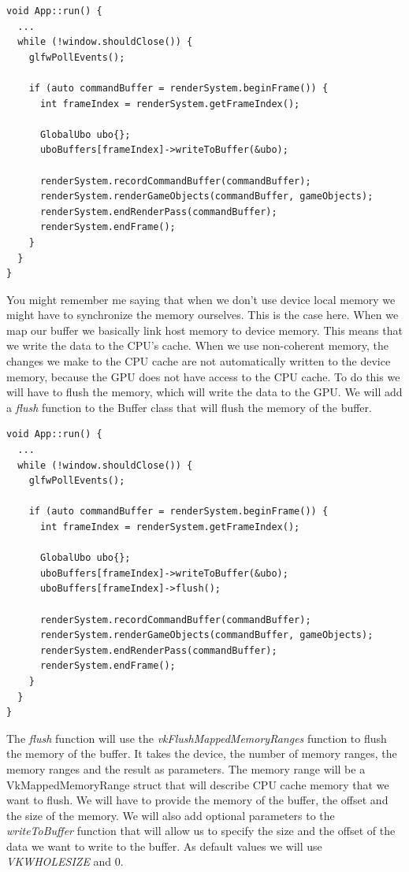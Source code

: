 \documentclass[12pt]{report} \usepackage{preamble}
\begin{document}
\begin{lstlisting}[Language=C++]
void App::run() {
  ...
  while (!window.shouldClose()) {
    glfwPollEvents();

    if (auto commandBuffer = renderSystem.beginFrame()) {
      int frameIndex = renderSystem.getFrameIndex();

      GlobalUbo ubo{};
      uboBuffers[frameIndex]->writeToBuffer(&ubo);

      renderSystem.recordCommandBuffer(commandBuffer);
      renderSystem.renderGameObjects(commandBuffer, gameObjects);
      renderSystem.endRenderPass(commandBuffer);
      renderSystem.endFrame();
    }
  }
}
\end{lstlisting}

You might remember me saying that when we don't use device local memory we might have to synchronize the memory ourselves. This is the case here.
When we map our buffer we basically link host memory to device memory. This means that we write the data to the CPU's cache.
When we use non-coherent memory, the changes we make to the CPU cache are not automatically written to the device memory, because the GPU does not have access to the CPU cache.
To do this we will have to flush the memory, which will write the data to the GPU. We will add a \textit{flush} function to the Buffer class that will flush the memory of the buffer.

\begin{lstlisting}[Language=C++]
void App::run() {
  ...
  while (!window.shouldClose()) {
    glfwPollEvents();

    if (auto commandBuffer = renderSystem.beginFrame()) {
      int frameIndex = renderSystem.getFrameIndex();

      GlobalUbo ubo{};
      uboBuffers[frameIndex]->writeToBuffer(&ubo);
      uboBuffers[frameIndex]->flush();

      renderSystem.recordCommandBuffer(commandBuffer);
      renderSystem.renderGameObjects(commandBuffer, gameObjects);
      renderSystem.endRenderPass(commandBuffer);
      renderSystem.endFrame();
    }
  }
}
\end{lstlisting}

The \textit{flush} function will use the \textit{vkFlushMappedMemoryRanges} function to flush the memory of the buffer.
It takes the device, the number of memory ranges, the memory ranges and the result as parameters. The memory range will be a VkMappedMemoryRange struct
that will describe CPU cache memory that we want to flush. We will have to provide the memory of the buffer, the offset and the size of the memory.
We will also add optional parameters to the \textit{writeToBuffer} function that will allow us to specify the size and the offset of the data we want to write to the buffer.
As default values we will use \textit{VK\textunderscore WHOLE\textunderscore SIZE} and 0.
\end{document}
